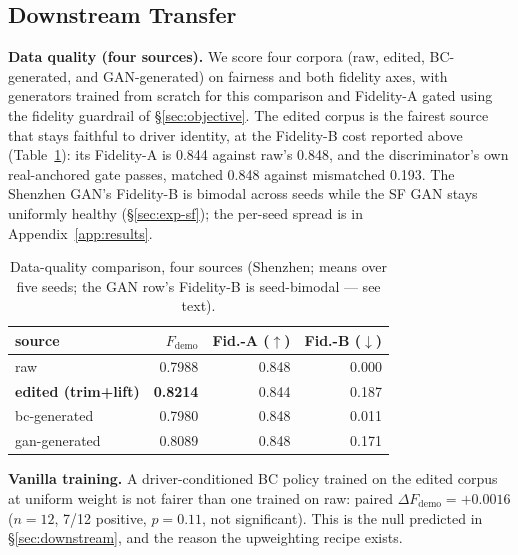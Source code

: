 \subsection{Downstream Transfer}\label{sec:exp-downstream}

\textbf{Data quality (four sources).} We score four corpora (raw, edited,
BC-generated, and GAN-generated) on fairness and both fidelity axes, with
generators trained from scratch for this comparison and Fidelity-A gated using
the fidelity guardrail of \S\ref{sec:objective}. The edited corpus is the
fairest source that stays faithful to driver identity, at the Fidelity-B cost
reported above (Table~\ref{tab:l1}): its Fidelity-A is 0.844 against raw's
0.848, and the discriminator's own real-anchored gate passes, matched 0.848
against mismatched 0.193. The Shenzhen GAN's Fidelity-B is bimodal across
seeds
while the SF GAN stays uniformly healthy (\S\ref{sec:exp-sf}); the per-seed
spread is in Appendix~\ref{app:results}.

\begin{table}[t]
\centering
\caption{Data-quality comparison, four sources (Shenzhen; means over five
seeds; the GAN row's Fidelity-B is seed-bimodal --- see text).}
\label{tab:l1}
\small
\begin{tabular}{lrrr}
\toprule
source & $F_{\mathrm{demo}}$ & Fid.-A ($\uparrow$) & Fid.-B ($\downarrow$) \\
\midrule
raw & 0.7988 & 0.848 & 0.000 \\
\textbf{edited (trim+lift)} & \textbf{0.8214} & 0.844 & 0.187 \\
bc-generated & 0.7980 & 0.848 & 0.011 \\
gan-generated & 0.8089 & 0.848 & 0.171 \\
\bottomrule
\end{tabular}
\end{table}

\textbf{Vanilla training.} A driver-conditioned BC
policy trained on the edited corpus at uniform weight is not fairer than one
trained on raw: paired $\Delta F_{\mathrm{demo}} = +0.0016$ ($n = 12$,
7/12 positive, $p = 0.11$, not significant). This is the null predicted in
\S\ref{sec:downstream}, and the reason the upweighting recipe exists.

